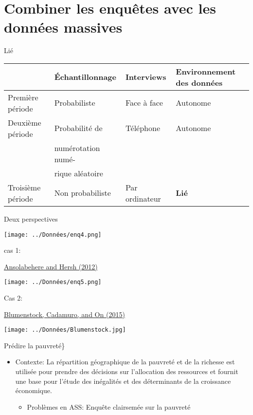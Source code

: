\documentclass[
  ignorenonframetext,
]{beamer}
\providecommand{\tightlist}{%
  \setlength{\itemsep}{0pt}\setlength{\parskip}{0pt}}
\begin{document}
\hypertarget{combiner-les-enquuxeates-avec-les-donnuxe9es-massives}{%
\section{Combiner les enquêtes avec les données
massives}\label{combiner-les-enquuxeates-avec-les-donnuxe9es-massives}}

\begin{frame}{Lié}
\protect\hypertarget{liuxe9}{}

\begin{longtable}[]{@{}llll@{}}
\toprule
& Échantillonnage & Interviews & Environnement des
données\tabularnewline
\midrule
\endhead
Première période & Probabiliste & Face à face & Autonome\tabularnewline
Deuxième période & Probabilité de & Téléphone & Autonome\tabularnewline
& numérotation numé- & &\tabularnewline
& rique aléatoire & &\tabularnewline
Troisième période & Non probabiliste & Par ordinateur &
\textbf{Lié}\tabularnewline
\bottomrule
\end{longtable}

\end{frame}

\begin{frame}{Deux perspectives}
\protect\hypertarget{deux-perspectives}{}

\texttt{[image: ../Données/enq4.png]}

\end{frame}

\begin{frame}{cas 1:}
\protect\hypertarget{cas-1}{}

\href{https://www.jstor.org/stable/23359641}{Ansolabehere and Hersh
(2012)}

\texttt{[image: ../Données/enq5.png]}

\end{frame}

\begin{frame}{Cas 2:}
\protect\hypertarget{cas-2}{}

\href{https://science.sciencemag.org/content/350/6264/1073}{Blumenstock,
Cadamuro, and On (2015)}

\texttt{[image: ../Données/Blumenstock.jpg]}

\end{frame}

\begin{frame}{Prédire la pauvreté\}}
\protect\hypertarget{pruxe9dire-la-pauvretuxe9}{}

\begin{itemize}
\tightlist
\item
  Contexte: La répartition géographique de la pauvreté et de la richesse
  est utilisée pour prendre des décisions sur l'allocation des
  ressources et fournit une base pour l'étude des inégalités et des
  déterminants de la croissance économique.

  \begin{itemize}
  \tightlist
  \item
    Problèmes en ASS: Enquête clairsemée sur la pauvreté
  \end{itemize}
\end{itemize}

\end{frame}
\end{document}
